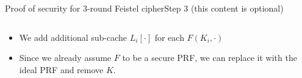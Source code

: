 \documentclass[aspectratio=169, lualatex, handout]{beamer}
\begin{document}
	\begin{frame}{Proof of security for 3-round Feistel cipher}{Step 3 (this content is optional)}
		\begin{columns}[c]
			\begin{column}{0.5\textwidth}
				\begin{itemize}[<+->]
					\item We add additional sub-cache $L_i[\cdot]$ for each $F(K_i,\cdot)$
					\item Since we already assume $F$ to be a secure PRF, we can replace it with the ideal PRF and remove $K$.
				\end{itemize}
			\end{column}
			\begin{column}{0.5\textwidth}
				\vspace{-1.5cm}
				\begin{center}
				\end{center}
			\end{column}
		\end{columns}
	\end{frame}
\end{document}
